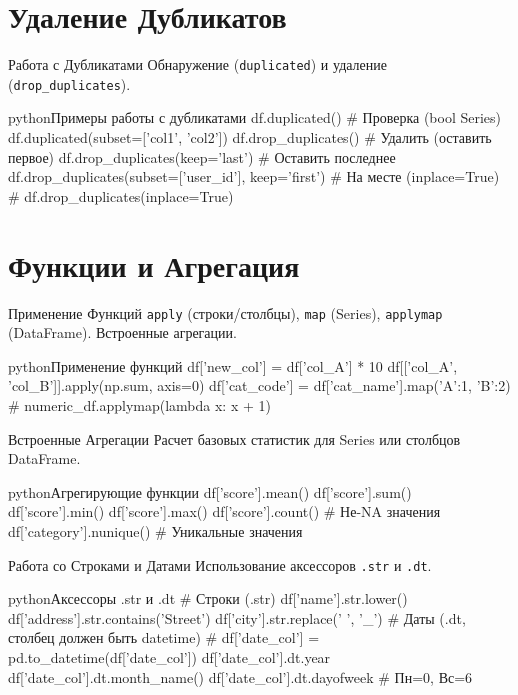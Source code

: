     \section{Удаление Дубликатов}
    
    \begin{myblock}{Работа с Дубликатами}
    Обнаружение (\texttt{duplicated}) и удаление (\texttt{drop\_duplicates}).
    \begin{codebox}{python}{Примеры работы с дубликатами}
    df.duplicated() # Проверка (bool Series)
    df.duplicated(subset=['col1', 'col2'])
    df.drop_duplicates() # Удалить (оставить первое)
    df.drop_duplicates(keep='last') # Оставить последнее
    df.drop_duplicates(subset=['user_id'], keep='first')
    # На месте (inplace=True)
    # df.drop_duplicates(inplace=True)
    \end{codebox}
    \end{myblock}
    
    \section{Функции и Агрегация}
    
    \begin{textbox}{Применение Функций}
    \texttt{apply} (строки/столбцы), \texttt{map} (Series), \texttt{applymap} (DataFrame). Встроенные агрегации.
    \begin{codebox}{python}{Применение функций}
    df['new_col'] = df['col_A'] * 10
    df[['col_A', 'col_B']].apply(np.sum, axis=0)
    df['cat_code'] = df['cat_name'].map({'A':1, 'B':2})
    # numeric_df.applymap(lambda x: x + 1)
    \end{codebox}
    \end{textbox}
    
    \begin{myblock}{Встроенные Агрегации}
    Расчет базовых статистик для Series или столбцов DataFrame.
    \begin{codebox}{python}{Агрегирующие функции}
    df['score'].mean()
    df['score'].sum()
    df['score'].min()
    df['score'].max()
    df['score'].count() # Не-NA значения
    df['category'].nunique() # Уникальные значения
    \end{codebox}
    \end{myblock}
    
    \begin{textbox}{Работа со Строками и Датами}
    Использование аксессоров \texttt{.str} и \texttt{.dt}.
    \begin{codebox}{python}{Аксессоры .str и .dt}
    # Строки (.str)
    df['name'].str.lower()
    df['address'].str.contains('Street')
    df['city'].str.replace(' ', '_')
    # Даты (.dt, столбец должен быть datetime)
    # df['date_col'] = pd.to_datetime(df['date_col'])
    df['date_col'].dt.year
    df['date_col'].dt.month_name()
    df['date_col'].dt.dayofweek # Пн=0, Вс=6
    \end{codebox}
    \end{textbox}
    
